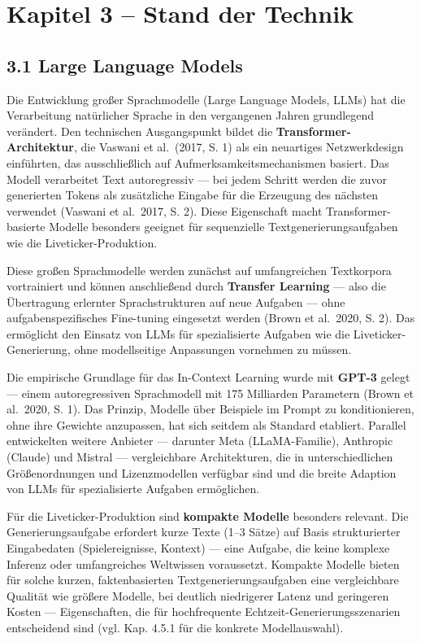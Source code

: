 \section{Kapitel 3 -- Stand der
Technik}\label{kapitel-3-stand-der-technik}

\subsection{3.1 Large Language Models}\label{large-language-models}

Die Entwicklung großer Sprachmodelle (Large Language Models, LLMs) hat
die Verarbeitung natürlicher Sprache in den vergangenen Jahren
grundlegend verändert. Den technischen Ausgangspunkt bildet die
\textbf{Transformer-Architektur}, die Vaswani et al.~(2017, S. 1) als
ein neuartiges Netzwerkdesign einführten, das ausschließlich auf
Aufmerksamkeitsmechanismen basiert. Das Modell verarbeitet Text
autoregressiv --- bei jedem Schritt werden die zuvor generierten Tokens
als zusätzliche Eingabe für die Erzeugung des nächsten verwendet
(Vaswani et al.~2017, S. 2). Diese Eigenschaft macht
Transformer-basierte Modelle besonders geeignet für sequenzielle
Textgenerierungsaufgaben wie die Liveticker-Produktion.

Diese großen Sprachmodelle werden zunächst auf umfangreichen Textkorpora
vortrainiert und können anschließend durch \textbf{Transfer Learning}
--- also die Übertragung erlernter Sprachstrukturen auf neue Aufgaben
--- ohne aufgabenspezifisches Fine-tuning eingesetzt werden (Brown et
al.~2020, S. 2). Das ermöglicht den Einsatz von LLMs für spezialisierte
Aufgaben wie die Liveticker-Generierung, ohne modellseitige Anpassungen
vornehmen zu müssen.

Die empirische Grundlage für das In-Context Learning wurde mit
\textbf{GPT-3} gelegt --- einem autoregressiven Sprachmodell mit 175
Milliarden Parametern (Brown et al.~2020, S. 1). Das Prinzip, Modelle
über Beispiele im Prompt zu konditionieren, ohne ihre Gewichte
anzupassen, hat sich seitdem als Standard etabliert. Parallel
entwickelten weitere Anbieter --- darunter Meta (LLaMA-Familie),
Anthropic (Claude) und Mistral --- vergleichbare Architekturen, die in
unterschiedlichen Größenordnungen und Lizenzmodellen verfügbar sind und
die breite Adaption von LLMs für spezialisierte Aufgaben ermöglichen.

Für die Liveticker-Produktion sind \textbf{kompakte Modelle} besonders
relevant. Die Generierungsaufgabe erfordert kurze Texte (1--3 Sätze) auf
Basis strukturierter Eingabedaten (Spielereignisse, Kontext) --- eine
Aufgabe, die keine komplexe Inferenz oder umfangreiches Weltwissen
voraussetzt. Kompakte Modelle bieten für solche kurzen, faktenbasierten
Textgenerierungsaufgaben eine vergleichbare Qualität wie größere
Modelle, bei deutlich niedrigerer Latenz und geringeren Kosten ---
Eigenschaften, die für hochfrequente Echtzeit-Generierungsszenarien
entscheidend sind (vgl. Kap. 4.5.1 für die konkrete Modellauswahl).


